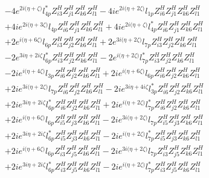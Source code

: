\begin{align}
 &-4 e^{2 i \Big(\eta +\zeta \Big)} l_{4p}^* Z_{{i 3}}^{H} Z_{{j 1}}^{H} Z_{{k 6}}^{H} Z_{{l 1}}^{H} -4 i e^{2 i \Big(\eta +2 \zeta \Big)} l_{1p} Z_{{i 6}}^{H} Z_{{j 1}}^{H} Z_{{k 6}}^{H} Z_{{l 1}}^{H} \nonumber \\ 
 &+4 i e^{2 i \Big(\eta +3 \zeta \Big)} l_{4p} Z_{{i 6}}^{H} Z_{{j 1}}^{H} Z_{{k 6}}^{H} Z_{{l 1}}^{H} +4 i e^{2 i \Big(\eta +\zeta \Big)} l_{4p}^* Z_{{i 6}}^{H} Z_{{j 1}}^{H} Z_{{k 6}}^{H} Z_{{l 1}}^{H} \nonumber \\ 
 &+2 e^{i \Big(\eta +6 \zeta \Big)} l_{6p} Z_{{i 3}}^{H} Z_{{j 2}}^{H} Z_{{k 6}}^{H} Z_{{l 1}}^{H} +2 e^{3 i \Big(\eta +2 \zeta \Big)} l_{7p} Z_{{i 3}}^{H} Z_{{j 2}}^{H} Z_{{k 6}}^{H} Z_{{l 1}}^{H} \nonumber \\ 
 &-2 e^{3 i \eta +2 i \zeta } l_{6p}^* Z_{{i 3}}^{H} Z_{{j 2}}^{H} Z_{{k 6}}^{H} Z_{{l 1}}^{H} -2 e^{i \Big(\eta +2 \zeta \Big)} l_{7p}^* Z_{{i 3}}^{H} Z_{{j 2}}^{H} Z_{{k 6}}^{H} Z_{{l 1}}^{H} \nonumber \\ 
 &-2 i e^{i \Big(\eta +4 \zeta \Big)} l_{3p} Z_{{i 6}}^{H} Z_{{j 2}}^{H} Z_{{k 6}}^{H} Z_{{l 1}}^{H} +2 i e^{i \Big(\eta +6 \zeta \Big)} l_{6p} Z_{{i 6}}^{H} Z_{{j 2}}^{H} Z_{{k 6}}^{H} Z_{{l 1}}^{H} \nonumber \\ 
 &+2 i e^{3 i \Big(\eta +2 \zeta \Big)} l_{7p} Z_{{i 6}}^{H} Z_{{j 2}}^{H} Z_{{k 6}}^{H} Z_{{l 1}}^{H} -2 i e^{3 i \eta +4 i \zeta } l_{3p}^* Z_{{i 6}}^{H} Z_{{j 2}}^{H} Z_{{k 6}}^{H} Z_{{l 1}}^{H} \nonumber \\ 
 &+2 i e^{3 i \eta +2 i \zeta } l_{6p}^* Z_{{i 6}}^{H} Z_{{j 2}}^{H} Z_{{k 6}}^{H} Z_{{l 1}}^{H} +2 i e^{i \Big(\eta +2 \zeta \Big)} l_{7p}^* Z_{{i 6}}^{H} Z_{{j 2}}^{H} Z_{{k 6}}^{H} Z_{{l 1}}^{H} \nonumber \\ 
 &+2 i e^{i \Big(\eta +6 \zeta \Big)} l_{6p} Z_{{i 5}}^{H} Z_{{j 3}}^{H} Z_{{k 6}}^{H} Z_{{l 1}}^{H} -2 i e^{3 i \Big(\eta +2 \zeta \Big)} l_{7p} Z_{{i 5}}^{H} Z_{{j 3}}^{H} Z_{{k 6}}^{H} Z_{{l 1}}^{H} \nonumber \\ 
 &+2 i e^{3 i \eta +2 i \zeta } l_{6p}^* Z_{{i 5}}^{H} Z_{{j 3}}^{H} Z_{{k 6}}^{H} Z_{{l 1}}^{H} -2 i e^{i \Big(\eta +2 \zeta \Big)} l_{7p}^* Z_{{i 5}}^{H} Z_{{j 3}}^{H} Z_{{k 6}}^{H} Z_{{l 1}}^{H} \nonumber \\ 
 &+2 i e^{i \Big(\eta +6 \zeta \Big)} l_{6p} Z_{{i 3}}^{H} Z_{{j 5}}^{H} Z_{{k 6}}^{H} Z_{{l 1}}^{H} -2 i e^{3 i \Big(\eta +2 \zeta \Big)} l_{7p} Z_{{i 3}}^{H} Z_{{j 5}}^{H} Z_{{k 6}}^{H} Z_{{l 1}}^{H} \nonumber \\ 
 &+2 i e^{3 i \eta +2 i \zeta } l_{6p}^* Z_{{i 3}}^{H} Z_{{j 5}}^{H} Z_{{k 6}}^{H} Z_{{l 1}}^{H} -2 i e^{i \Big(\eta +2 \zeta \Big)} l_{7p}^* Z_{{i 3}}^{H} Z_{{j 5}}^{H} Z_{{k 6}}^{H} Z_{{l 1}}^{H} \nonumber \\ 

\end{align}
